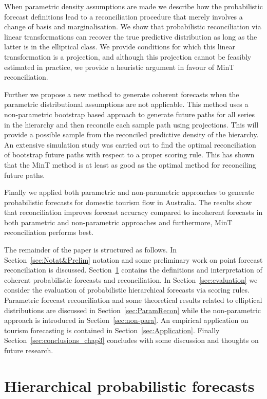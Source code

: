 \documentclass[12pt]{article}
\theoremstyle{definition}
\begin{document}
When parametric density assumptions are made we describe how the probabilistic forecast definitions lead to a reconciliation procedure that merely involves a change of basis and marginalisation. We show that probabilistic reconciliation via linear transformations can recover the true predictive distribution as long as the latter is in the elliptical class. We provide conditions for which this linear transformation is a projection, and although this projection cannot be feasibly estimated in practice, we provide a heuristic argument in favour of MinT reconciliation.

Further we propose a new method to generate coherent forecasts when the parametric distributional assumptions are not applicable. This method uses a non-parametric bootstrap based approach to generate future paths for all series in the hierarchy and then reconcile each sample path using projections. This will provide a possible sample from the reconciled predictive density of the hierarchy. An extensive simulation study was carried out to find the optimal reconciliation of bootstrap future paths with respect to a proper scoring rule. This has shown that the MinT method is at least as good as the optimal method for reconciling future paths.

Finally we applied both parametric and non-parametric approaches to generate probabilistic forecasts for domestic tourism flow in Australia. The results show that reconciliation improves forecast accuracy compared to incoherent forecasts in both parametric and non-parametric approaches and furthermore, MinT reconciliation performs best.

The remainder of the paper is structured as follows. In Section~\ref{sec:Notat&Prelim} notation and some preliminary work on point forecast reconciliation is discussed. Section~\ref{sec:ProbForecasts} contains the definitions and interpretation of coherent probabilistic forecasts and reconciliation. In Section~\ref{sec:evaluation} we consider the evaluation of probabilistic hierarchical forecasts via scoring rules. Parametric forecast reconciliation and some theoretical results related to elliptical distributions are discussed in Section~\ref{sec:ParamRecon} while the non-parametric approach is introduced in Section~\ref{sec:non-para}. An empirical application on tourism forecasting is contained in Section~\ref{sec:Application}. Finally Section~\ref{sec:conclusions_chap3} concludes with some discussion and thoughts on future research.

\section{Hierarchical probabilistic forecasts}\label{sec:ProbForecasts}
\end{document}

